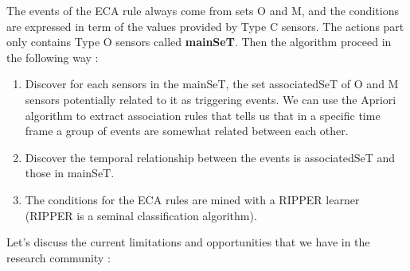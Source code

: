 \documentclass[11pt]{article}
\begin{document}
The events of the ECA rule always come from sets O and M, and the conditions are expressed in term of the values provided by Type C sensors. The actions part only contains Type O sensors called \textbf{mainSeT}. Then the algorithm proceed in the following way :

\begin{enumerate}
\item Discover for each sensors in the mainSeT, the set associatedSeT of O and M sensors potentially related to it as triggering events. We can use the Apriori algorithm to extract association rules that tells us that in a specific time frame a group of events are somewhat related between each other.

\item Discover the temporal relationship between the events is associatedSeT and those in mainSeT.

\item The conditions for the ECA rules are mined with a RIPPER learner (RIPPER is a seminal classification algorithm).
\end{enumerate}

Let's discuss the current limitations and opportunities that we have in the research community :
\end{document}
